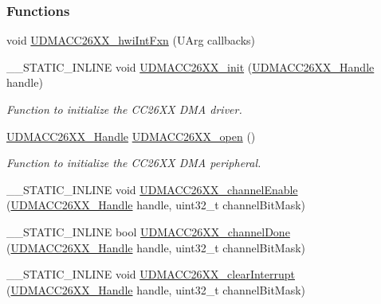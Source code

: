 \subsubsection*{Functions}
\begin{DoxyCompactItemize}
\item 
void \hyperlink{_u_d_m_a_c_c26_x_x_8h_a279762f77bf9dc5e5e12f14db1fdbaba}{U\-D\-M\-A\-C\-C26\-X\-X\-\_\-hwi\-Int\-Fxn} (U\-Arg callbacks)
\item 
\-\_\-\-\_\-\-S\-T\-A\-T\-I\-C\-\_\-\-I\-N\-L\-I\-N\-E void \hyperlink{_u_d_m_a_c_c26_x_x_8h_a8bb3d9eff25abd3378f9cbc3189440bf}{U\-D\-M\-A\-C\-C26\-X\-X\-\_\-init} (\hyperlink{_u_d_m_a_c_c26_x_x_8h_a969a9feb0f822c4764ef1da2ff5066cf}{U\-D\-M\-A\-C\-C26\-X\-X\-\_\-\-Handle} handle)
\begin{DoxyCompactList}\small\item\em Function to initialize the C\-C26\-X\-X D\-M\-A driver. \end{DoxyCompactList}\item 
\hyperlink{_u_d_m_a_c_c26_x_x_8h_a969a9feb0f822c4764ef1da2ff5066cf}{U\-D\-M\-A\-C\-C26\-X\-X\-\_\-\-Handle} \hyperlink{_u_d_m_a_c_c26_x_x_8h_aa7a244c7cfec8551f11ad5d4b5afa0ff}{U\-D\-M\-A\-C\-C26\-X\-X\-\_\-open} ()
\begin{DoxyCompactList}\small\item\em Function to initialize the C\-C26\-X\-X D\-M\-A peripheral. \end{DoxyCompactList}\item 
\-\_\-\-\_\-\-S\-T\-A\-T\-I\-C\-\_\-\-I\-N\-L\-I\-N\-E void \hyperlink{_u_d_m_a_c_c26_x_x_8h_a1eec9bde0731a07b492a9f483b0c554b}{U\-D\-M\-A\-C\-C26\-X\-X\-\_\-channel\-Enable} (\hyperlink{_u_d_m_a_c_c26_x_x_8h_a969a9feb0f822c4764ef1da2ff5066cf}{U\-D\-M\-A\-C\-C26\-X\-X\-\_\-\-Handle} handle, uint32\-\_\-t channel\-Bit\-Mask)
\item 
\-\_\-\-\_\-\-S\-T\-A\-T\-I\-C\-\_\-\-I\-N\-L\-I\-N\-E bool \hyperlink{_u_d_m_a_c_c26_x_x_8h_a5725e1db13295ef9096723f2b7c6364c}{U\-D\-M\-A\-C\-C26\-X\-X\-\_\-channel\-Done} (\hyperlink{_u_d_m_a_c_c26_x_x_8h_a969a9feb0f822c4764ef1da2ff5066cf}{U\-D\-M\-A\-C\-C26\-X\-X\-\_\-\-Handle} handle, uint32\-\_\-t channel\-Bit\-Mask)
\item 
\-\_\-\-\_\-\-S\-T\-A\-T\-I\-C\-\_\-\-I\-N\-L\-I\-N\-E void \hyperlink{_u_d_m_a_c_c26_x_x_8h_a1571fcbf7f44fca000fef38d8955eae6}{U\-D\-M\-A\-C\-C26\-X\-X\-\_\-clear\-Interrupt} (\hyperlink{_u_d_m_a_c_c26_x_x_8h_a969a9feb0f822c4764ef1da2ff5066cf}{U\-D\-M\-A\-C\-C26\-X\-X\-\_\-\-Handle} handle, uint32\-\_\-t channel\-Bit\-Mask)

\end{DoxyCompactItemize}
